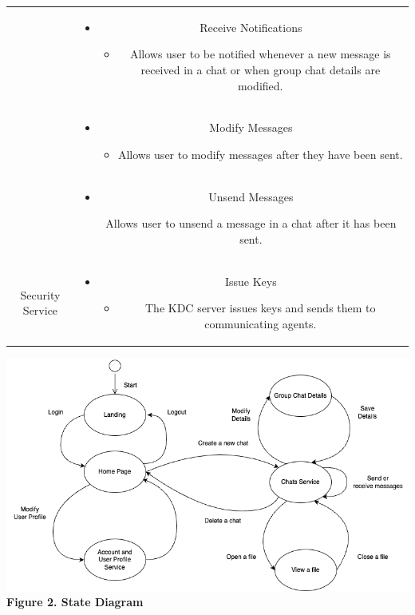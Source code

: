 \documentclass[]{article}
\begin{document}
\begin{center}
\begin{tabular}{ |c|c| }
& \begin{itemize} \item Receive Notifications \begin{itemize} \item Allows user to be notified whenever a new message is received in a chat or when group chat details are modified. \end{itemize} \end{itemize}\\
& \begin{itemize} \item Modify Messages \begin{itemize} \item Allows user to modify messages after they have been sent. \end{itemize} \end{itemize}\\
& \begin{itemize} \item Unsend Messages \begin{itemize} Allows user to unsend a message in a chat after it has been sent. \end{itemize} \end{itemize}\\
\hline
Security Service & \begin{itemize} \item Issue Keys \begin{itemize} \item The KDC server issues keys and sends them to communicating agents. \end{itemize} \end{itemize} \\
\hline
\end{tabular}
\end{center}
\newline
\begin{center}
\includegraphics[scale=0.25]{state-diagram.png}\\
\caption{\textbf{Figure 2. State Diagram}}
\end{center}
\end{document}
